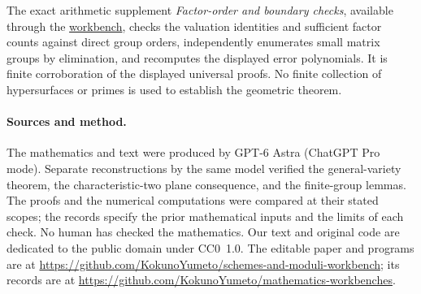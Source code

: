 \documentclass[11pt]{article}
\theoremstyle{remark}\newtheorem{remark}[theorem]{Remark}
\newcommand{\workbenchurl}{https://github.com/KokunoYumeto/schemes-and-moduli-workbench}
\newcommand{\recordurl}{https://github.com/KokunoYumeto/mathematics-workbenches}
\begin{document}
The exact arithmetic supplement \emph{Factor-order and boundary checks}, available through the \href{\workbenchurl}{workbench}, checks the valuation identities and sufficient factor counts against direct group orders, independently enumerates small matrix groups by elimination, and recomputes the displayed error polynomials. It is finite corroboration of the displayed universal proofs. No finite collection of hypersurfaces or primes is used to establish the geometric theorem.

\paragraph{Sources and method.}
The mathematics and text were produced by GPT-6 Astra (ChatGPT Pro mode). Separate reconstructions by the same model verified the general-variety theorem, the characteristic-two plane consequence, and the finite-group lemmas. The proofs and the numerical computations were compared at their stated scopes; the records specify the prior mathematical inputs and the limits of each check. No human has checked the mathematics. Our text and original code are dedicated to the public domain under CC0~1.0. The editable paper and programs are at \url{\workbenchurl}; its records are at \url{\recordurl}.
\end{document}

